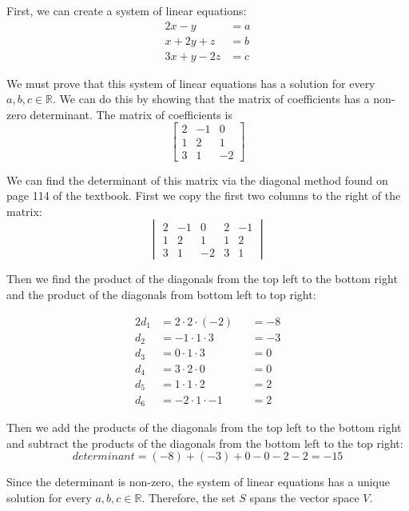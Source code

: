 First, we can create a system of linear equations:
\begin{align*}
	2x - y      & = a \\
	x + 2y + z  & = b \\
	3x + y - 2z & = c
\end{align*}

We must prove that this system of linear equations has a solution for every $a,b,c\in\mathbb{R}$. We can do this by showing that the matrix of coefficients has a non-zero determinant. The matrix of coefficients is
$$
	\begin{bmatrix}
		2 & -1 & 0  \\
		1 & 2  & 1  \\
		3 & 1  & -2
	\end{bmatrix}
$$

We can find the determinant of this matrix via the diagonal method found on page 114 of the textbook. First we copy the first two columns to the right of the matrix:
$$
	\begin{vmatrix}
		2 & -1 & 0  & 2 & -1 \\
		1 & 2  & 1  & 1 & 2  \\
		3 & 1  & -2 & 3 & 1
	\end{vmatrix}
$$

Then we find the product of the diagonals from the top left to the bottom right and the product of the diagonals from bottom left to top right:

\begin{alignat*}{2}
	d_1 & = 2\cdot2\cdot(-2) &  & = -8 \\
	d_2 & = -1\cdot1\cdot3   &  & = -3 \\
	d_3 & = 0\cdot1\cdot3    &  & = 0  \\
	d_4 & = 3\cdot2\cdot0    &  & = 0  \\
	d_5 & = 1\cdot1\cdot2    &  & = 2  \\
	d_6 & = -2\cdot1\cdot-1  &  & = 2
\end{alignat*}

Then we add the products of the diagonals from the top left to the bottom right and subtract the products of the diagonals from the bottom left to the top right:
$$
	determinant = (-8) + (-3) + 0 - 0 - 2 - 2 = -15
$$

Since the determinant is non-zero, the system of linear equations has a unique solution for every $a,b,c\in\mathbb{R}$. Therefore, the set $S$ spans the vector space $V$.

